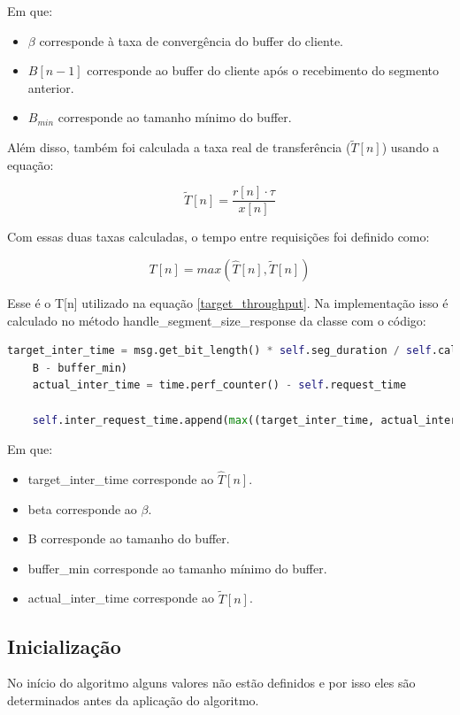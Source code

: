 \documentclass[10pt,twocolumn,letterpaper]{article}
\begin{document}
Em que:
\begin{itemize}
	\item $\beta$ corresponde à taxa de convergência do buffer do cliente.
	\item $B[n-1]$ corresponde ao buffer do cliente após o recebimento do segmento anterior.
	\item $B_{min}$ corresponde ao tamanho mínimo do buffer.
\end{itemize}

Além disso, também foi calculada a taxa real de transferência ($\tilde{T}[n]$) usando a equação:

\begin{equation}
	\tilde{T}[n] = \frac{r[n] \cdot \tau}{x[n]}
\end{equation}

Com essas duas taxas calculadas, o tempo entre requisições foi definido como:

\begin{equation}
	T[n] = max(\hat{T}[n], \tilde{T}[n])
\end{equation}

Esse é o T[n] utilizado na equação \ref{target_throughput}. Na implementação isso é calculado no método handle\_segment\_size\_response da classe com o código:

\begin{lstlisting}[language=python]
	target_inter_time = msg.get_bit_length() * self.seg_duration / self.calc_throughputs[-1] + beta * (
	B - buffer_min)
	actual_inter_time = time.perf_counter() - self.request_time
	
	self.inter_request_time.append(max((target_inter_time, actual_inter_time))) 
\end{lstlisting}

Em que:

\begin{itemize}
	\item target\_inter\_time corresponde ao $\hat{T}[n]$.
	\item beta corresponde ao $\beta$.
	\item B corresponde ao tamanho do buffer.
	\item buffer\_min corresponde ao tamanho mínimo do buffer.
	\item actual\_inter\_time corresponde ao $\tilde{T}[n]$.
\end{itemize}

\subsection{Inicialização}
No início do algoritmo alguns valores não estão definidos e por isso eles são determinados antes da aplicação do algoritmo.
\end{document}
